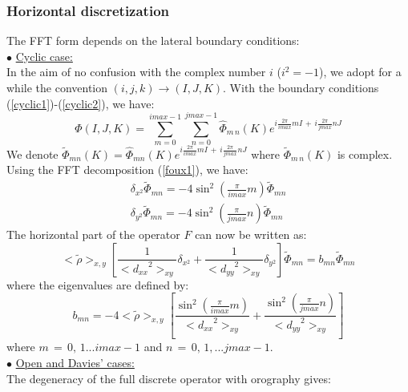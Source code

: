 \subsubsection{Horizontal discretization}
The FFT form depends on the lateral boundary conditions:\\
$\bullet$ \underline{Cyclic case:}\\
In the aim of no confusion with the complex number $i$ ($i^2 = -1$), we adopt
for a while the convention $(i, j, k) \rightarrow (I, J, K)$. With the boundary
conditions (\ref{cyclic1})-(\ref{cyclic2}), we have:
\begin{equation}
\label{foux1}
\Phi (I, J, K) =   \sum_{m=0}^{imax-1} \sum_{n=0}^{jmax-1}
\widehat{\Phi}_{m\, n}(K) e^ {i\frac {2\pi}{imax} m I \, + \,
i\frac {2\pi}{jmax} n J }
\end{equation}
We denote $\tilde{\Phi} _{m n}(K) = \widehat{\Phi} _{m n}(K)
e^ {i\frac {2\pi}{imax} m I \, + \, i\frac {2\pi}{jmax} n J } $ where
$\tilde{\Phi}_{m\, n}(K)$ is complex. Using the FFT decomposition
(\ref{foux1}), we have:\\
\begin{eqnarray*}
\delta _{x^2} \tilde{\Phi} _{m n} = - 4 \sin ^2 \left( \frac {\pi} {imax}
 m \right)     \tilde{\Phi} _{m n}  \\
\delta _{y^2} \tilde{\Phi}_{m n}  = - 4 \sin ^2 \left( \frac {\pi} {jmax}
 n \right)      \tilde{\Phi} _{m n}
\end{eqnarray*}
The horizontal part of the operator $F$ can now be written as:
\begin{equation}
\label{bmn}
<\tilde{\rho}>_{x, y} \left[ \dfrac {1} {<{d_{xx}}^2>_{xy}} \delta _{x^2}
+ \dfrac{1}{<{d_{yy}}^2>_{xy}}\delta _{y^2} \right]
\tilde{\Phi} _{m n} = b_{mn}  \tilde{\Phi}_{m n}
\end{equation}
where the eigenvalues are defined by:
\begin{displaymath}
b_{mn} = - 4 <\tilde{\rho}>_{x,y} \left[
\dfrac{\sin ^2 \left( \frac {\pi} {imax} m \right)} {<{d_{xx}}^2>_{xy}}   +
\dfrac{\sin ^2 \left( \frac {\pi} {jmax} n \right)} {<{d_{yy}}^2>_{xy}}
\right]
\end{displaymath}
where $m\,=\,0, \, 1...imax-1$ and $n\,=\,0,\, 1,...jmax-1$.\\
$\bullet$ \underline{Open and Davies' cases:}\\
The degeneracy of the full discrete operator with orography gives:
